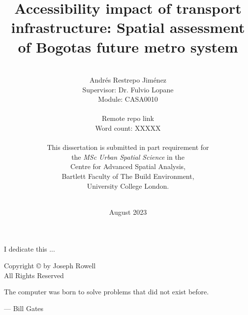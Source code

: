 \documentclass[12pt, a4paper]{report}
\date{August 2023}
\title{Accessibility impact of transport infrastructure: Spatial assessment of Bogota\textquotesingle s future metro system}
\author{\\ \Large{Andr\'{e}s Restrepo Jim\'{e}nez}
\\ Supervisor: Dr. Fulvio Lopane 
\\ Module: CASA0010
\\
\\ Remote repo link
\\ Word count: XXXXX
\\
\\
This dissertation is submitted in part requirement for \\the \textit{MSc Urban Spatial Science} in the \\Centre for Advanced Spatial Analysis, \\Bartlett Faculty of The Build Environment, \\University College London.
\\ \\
}
\begin{document}
      

\thispagestyle{headings}
\maketitle
\FloatBarrier
{}

\thispagestyle{empty}
\begin{abstract}


\end{abstract}
\newpage
\thispagestyle{empty}
\begin{center}
I dedicate this ...
\end{center}

\newpage
\thispagestyle{empty}
\vspace*{\fill}
\begin{center}
Copyright \copyright  {} by Joseph Rowell \\ All Rights Reserved
\end{center}
\vspace*{\fill}
\newpage
\thispagestyle{empty}
\epigraph{The computer was born to solve problems that did not exist before.}{--- \textup{Bill Gates}}
\end{document}
